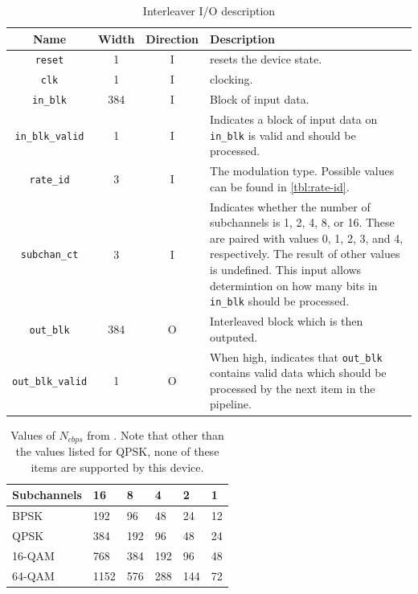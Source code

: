 \documentclass[dvips,10pt,twocolumn]{article}
\newcommand{\wire}{\texttt}
\begin{document}
\begin{table} \begin{tabularx}{\textwidth}{c|c|c|X}
	\label{tbl:interleave-io}
	Name & Width & Direction & Description \\ \hline

	\wire{reset} & 1 & I & resets the device state. \\

	\wire{clk}   & 1 & I & clocking. \\

	\wire{in\_blk} & 384 & I & Block of input data. \\

	\wire{in\_blk\_valid} & 1 & I & Indicates a block of input data on
	\wire{in\_blk} is valid and should be processed. \\

	\wire{rate\_id} & 3 & I & The modulation type. Possible values can be
	found in \autoref{tbl:rate-id}. \\

	\wire{subchan\_ct} & 3 & I & Indicates whether the number of subchannels
	is 1, 2, 4, 8, or 16. These are paired with values 0, 1, 2, 3, and 4,
	respectively. The result of other values is undefined. This input
	allows determintion on how many bits in \wire{in\_blk} should be
	processed. \\

	\wire{out\_blk} & 384 & O & Interleaved block which is then outputed.
	\\

	\wire{out\_blk\_valid} & 1 & O & When high, indicates that
	\wire{out\_blk} contains valid data which should be processed by the
	next item in the pipeline. 
\end{tabularx} \caption{Interleaver I/O description} \end{table}


\begin{table} \begin{tabularx}{\textwidth}{X|X|X|X|X|X}
	\label{tbl:Ncbps}
	Subchannels & 16 & 8 & 4 & 2 & 1 \\ \hline
	
	BPSK   & 192  & 96  & 48  & 24  & 12 \\
	QPSK   & 384  & 192 & 96  & 48  & 24 \\
	16-QAM & 768  & 384 & 192 & 96  & 48 \\
	64-QAM & 1152 & 576 & 288 & 144 & 72
\end{tabularx} \caption{Values of $N_{cbps}$ from \cite{IEEE:802.16}. Note
that other than the values listed for QPSK, none of these items are
supported by this device.} \end{table}
\end{document}
